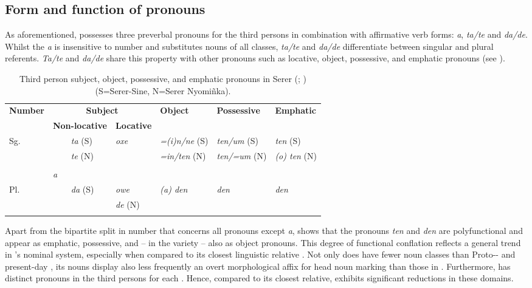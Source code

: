 \documentclass[output=paper
,newtxmath
,modfonts
,nonflat]{langsci/langscibook}
\begin{document}
\subsection{Form and function of pronouns}\label{sec:apel:2.1}

As aforementioned,  possesses three preverbal  pronouns for the third persons in combination with affirmative verb forms: \textit{a}, \textit{ta/te} and \textit{da/de}. Whilst the  \textit{a} is insensitive to number and substitutes nouns of all classes, \textit{ta/te} and \textit{da/de} differentiate between singular and plural referents. \textit{Ta/te} and \textit{da/de} share this property with other  pronouns such as locative, object, possessive, and emphatic pronouns (see ).

\begin{table}
\begin{tabularx}{\textwidth}{XlXXXXX}
\lsptoprule
\bfseries Number & \multicolumn{3}{c}{ \bfseries Subject} & \bfseries Object & \bfseries Possessive & \bfseries Emphatic \\
& \multicolumn{2}{l}{\bfseries Non-locative} & \multicolumn{1}{l}{\bfseries Locative} &  & \\
\midrule
Sg. & & \textit{ta} (S) & \textit{oxe} & \textit{=(i)n/ne} (S) &  \textit{ten/um} (S) & \textit{ten} (S) \\
 	& & \textit{te} (N) &   & \textit{=in/ten} (N) &   \textit{ten/=um} (N) & \textit{(o) ten} (N) \\\\
 & \textit{a} & & & & \\
Pl. &  & \textit{da} (S) &   \textit{owe} & \textit{(a) den} & \textit{den} & \textit{den} \\
 & & & \textit{de} (N)	 &	 	\\
\lspbottomrule
\end{tabularx}
\caption{Third person subject, object, possessive, and emphatic pronouns in Serer (\citealt{Faye1979}; \citealt{Renaudier2012}) (S=Serer-Sine, N=Serer Nyomiñka).}
\label{tab:apel:1}
\end{table}

Apart from the bipartite split in number that concerns all pronouns except \textit{a},  shows that the pronouns \textit{ten} and \textit{den} are polyfunctional and appear as emphatic, possessive, and -- in the  variety -- also as object pronouns. This degree of functional conflation reflects a general trend in ’s nominal system, especially when compared to its closest linguistic relative . Not only does  have fewer noun classes than Proto-- and present-day  \citep{Merrill14}, its nouns display also less frequently an overt morphological affix for head noun marking than those in . Furthermore,  has distinct pronouns in the third persons for each . Hence, compared to its closest relative,  exhibits significant reductions in these domains. 
\end{document}
